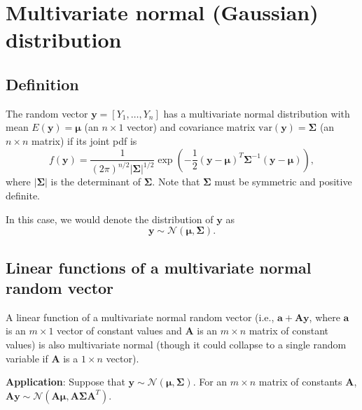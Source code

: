 \documentclass[
]{book}
\theoremstyle{definition}
\theoremstyle{definition}
\theoremstyle{definition}
\theoremstyle{definition}
\theoremstyle{remark}
\begin{document}
\hypertarget{multivariate-normal-gaussian-distribution}{%
\section{Multivariate normal (Gaussian) distribution}\label{multivariate-normal-gaussian-distribution}}

\hypertarget{definition-1}{%
\subsection{Definition}\label{definition-1}}

The random vector \(\mathbf{y}=[Y_1,\dots,Y_n]\) has a multivariate normal distribution with mean \(E(\mathbf{y})=\boldsymbol{\mu}\) (an \(n\times 1\) vector) and covariance matrix \(\mathrm{var}(\mathbf{y})=\boldsymbol{\Sigma}\) (an \(n\times n\) matrix) if its joint pdf is
\[
f(\mathbf{y})=\frac{1}{(2\pi)^{n/2} |\boldsymbol{\Sigma}|^{1/2} }  \exp\left(-\frac{1}{2} (\mathbf{y}-\boldsymbol{\mu})^T \boldsymbol{\Sigma}^{-1} (\mathbf{y}-\boldsymbol{\mu})\right),
\]
where \(|\boldsymbol{\Sigma}|\) is the determinant of \(\boldsymbol{\Sigma}\). Note that \(\boldsymbol{\Sigma}\) must be symmetric and positive definite.

In this case, we would denote the distribution of \(\mathbf{y}\) as \[\mathbf{y}\sim \mathcal{N}(\boldsymbol{\mu},\boldsymbol{\Sigma}).\]

\hypertarget{linear-functions-of-a-multivariate-normal-random-vector}{%
\subsection{Linear functions of a multivariate normal random vector}\label{linear-functions-of-a-multivariate-normal-random-vector}}

A linear function of a multivariate normal random vector (i.e., \(\mathbf{a}+\mathbf{A}\mathbf{y}\), where \(\mathbf{a}\) is an \(m\times 1\) vector of constant values and \(\mathbf{A}\) is an \(m\times n\) matrix of constant values) is also multivariate normal (though it could collapse to a single random variable if \(\mathbf{A}\) is a \(1\times n\) vector).

\textbf{Application}: Suppose that \(\mathbf{y}\sim \mathcal{N}(\boldsymbol{\mu},\boldsymbol{\Sigma})\). For an \(m\times n\) matrix of constants \(\mathbf{A}\), \(\mathbf{A}\mathbf{y}\sim \mathcal{N}(\mathbf{A}\boldsymbol{\mu},\mathbf{A}\boldsymbol{\Sigma} \mathbf{A}^T)\).
\end{document}
